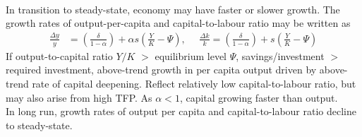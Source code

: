 \begin{remark} \\
In transition to steady-state, economy may have faster or slower growth. The growth rates of output-per-capita and capital-to-labour ratio may be written as
\begin{align}
\frac{\Delta y}{y} &= \left( \frac{\delta}{1-\alpha} \right) + \alpha s \left( \frac{Y}{K}  - \Psi \right), \ \ \ \ \ \ \frac{\Delta k}{k} = \left( \frac{\delta}{1-\alpha} \right) + s \left( \frac{Y}{K}  - \Psi \right) \nonumber 
\end{align}
If output-to-capital ratio $Y/K$ $>$ equilibrium level $\Psi$, savings/investment $>$ required investment, above-trend growth in per capita output driven by above-trend rate of capital deepening. Reflect relatively low capital-to-labour ratio, but may also arise from high TFP. As $\alpha < 1$, capital growing faster than output.\\
In long run, growth rates of output per capita and capital-to-labour ratio decline to steady-state.
\end{remark}

